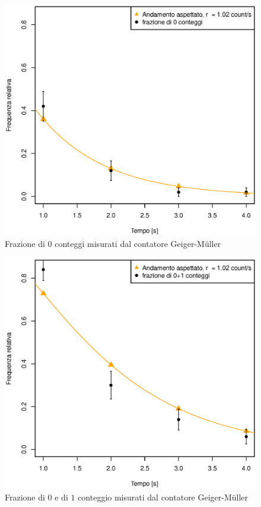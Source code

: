\documentclass[10pt,oneside,a4paper]{article}
\begin{document}

\begin{figure}[H]
\caption{Frazione di $0$ conteggi misurati dal contatore Geiger-M\"uller}
\label{fig:0conteggi}
\centering
\includegraphics[scale=0.7]{0.eps}
\end{figure}

\begin{figure}[H]
\caption{Frazione di $0$ e di $1$ conteggio misurati dal contatore Geiger-M\"uller}
\label{fig:0+1conteggi}
\centering
\includegraphics[scale=0.7]{0+1.eps}
\end{figure}
\end{document}
